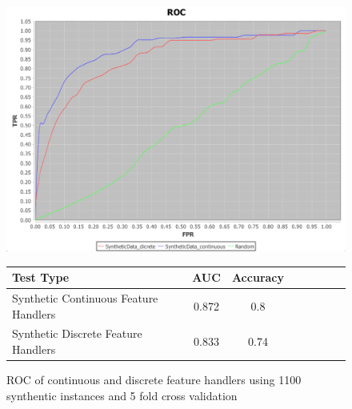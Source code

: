 \documentclass[a4paper,11pt]{scrreprt}
\begin{document}
\begin{figure}[h!]
\centering
\caption{ROC of continuous and discrete feature handlers using 1100 synthentic instances and 5 fold cross validation}
\includegraphics[scale=0.45, trim=0 0 0 0, clip=true] {1000-instance-training-100-testing-synthetictest.png}
\label{fig:indexes}
\begin{tabular}{l*{6}{c}r}
Test Type & AUC & Accuracy \\
\hline
Synthetic Continuous Feature Handlers & 0.872 & 0.8 \\
Synthetic Discrete Feature Handlers & 0.833 & 0.74 \\

\end{tabular}
\end{figure}
\end{document}

